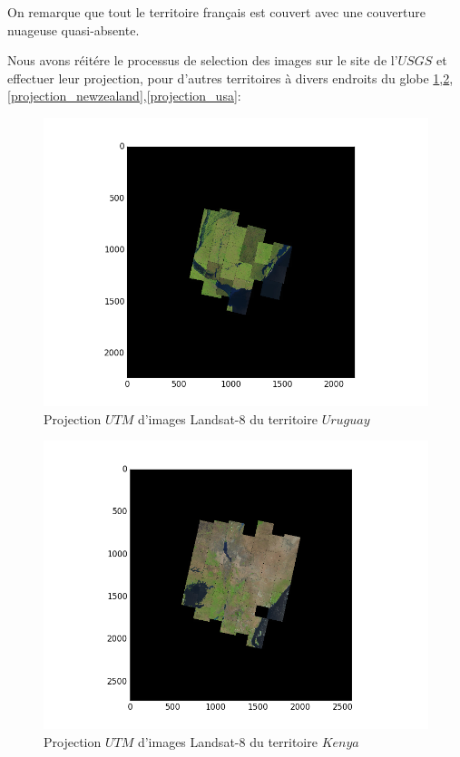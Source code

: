 \documentclass{book}
\begin{document}
On remarque que tout le territoire français est couvert avec une couverture nuageuse quasi-absente.

\clearpage

Nous avons réitére le processus de selection des images sur le site de l'$USGS$ et effectuer leur projection,
pour d'autres territoires à divers endroits du globe \ref{projection_uruguay},\ref{projection_kenya},\ref{projection_newzealand},\ref{projection_usa}:
\begin{figure}[H]
\begin{center}
\includegraphics[scale=0.8]{images/projection_uruguay.png}
\end{center}
\caption{Projection $UTM$ d'images Landsat-8 du territoire $Uruguay$}
\label{projection_uruguay}
\end{figure}
\begin{figure}[H]
\begin{center}
\includegraphics[scale=0.8]{images/projection_kenya.png}
\end{center}
\caption{Projection $UTM$ d'images Landsat-8 du territoire $Kenya$}
\label{projection_kenya}
\end{figure}
\end{document}
